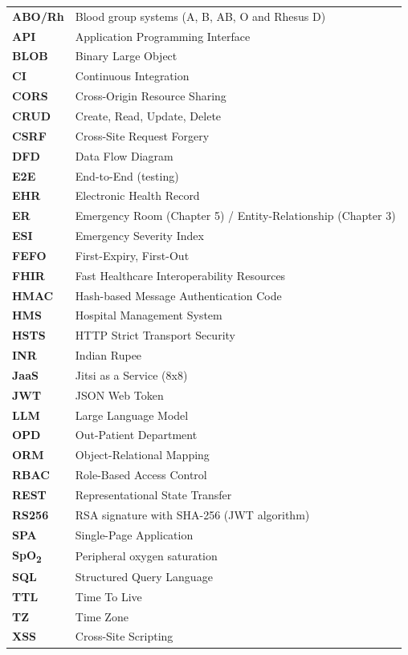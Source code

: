 \begin{longtable}{L{2.6cm}L{11cm}}
\textbf{ABO/Rh} & Blood group systems (A, B, AB, O and Rhesus D) \\
\textbf{API} & Application Programming Interface \\
\textbf{BLOB} & Binary Large Object \\
\textbf{CI} & Continuous Integration \\
\textbf{CORS} & Cross-Origin Resource Sharing \\
\textbf{CRUD} & Create, Read, Update, Delete \\
\textbf{CSRF} & Cross-Site Request Forgery \\
\textbf{DFD} & Data Flow Diagram \\
\textbf{E2E} & End-to-End (testing) \\
\textbf{EHR} & Electronic Health Record \\
\textbf{ER} & Emergency Room (Chapter 5) / Entity-Relationship (Chapter 3) \\
\textbf{ESI} & Emergency Severity Index \\
\textbf{FEFO} & First-Expiry, First-Out \\
\textbf{FHIR} & Fast Healthcare Interoperability Resources \\
\textbf{HMAC} & Hash-based Message Authentication Code \\
\textbf{HMS} & Hospital Management System \\
\textbf{HSTS} & HTTP Strict Transport Security \\
\textbf{INR} & Indian Rupee \\
\textbf{JaaS} & Jitsi as a Service (8x8) \\
\textbf{JWT} & JSON Web Token \\
\textbf{LLM} & Large Language Model \\
\textbf{OPD} & Out-Patient Department \\
\textbf{ORM} & Object-Relational Mapping \\
\textbf{RBAC} & Role-Based Access Control \\
\textbf{REST} & Representational State Transfer \\
\textbf{RS256} & RSA signature with SHA-256 (JWT algorithm) \\
\textbf{SPA} & Single-Page Application \\
\textbf{SpO\textsubscript{2}} & Peripheral oxygen saturation \\
\textbf{SQL} & Structured Query Language \\
\textbf{TTL} & Time To Live \\
\textbf{TZ} & Time Zone \\
\textbf{XSS} & Cross-Site Scripting \\
\end{longtable}
